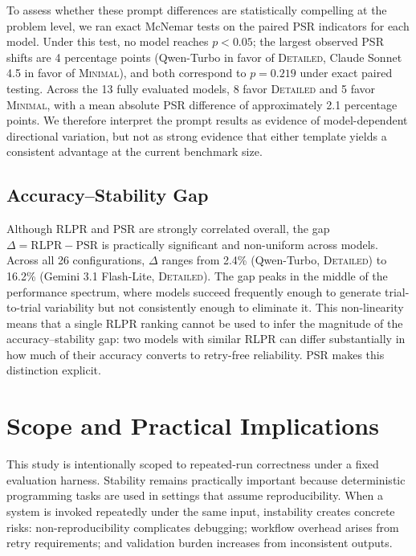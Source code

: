 \documentclass[11pt]{article}
\begin{document}
To assess whether these prompt differences are statistically compelling at the problem level, we ran exact McNemar tests on the paired PSR indicators for each model. Under this test, no model reaches $p<0.05$; the largest observed PSR shifts are 4 percentage points (Qwen-Turbo in favor of \textsc{Detailed}, Claude Sonnet 4.5 in favor of \textsc{Minimal}), and both correspond to $p=0.219$ under exact paired testing. Across the 13 fully evaluated models, 8 favor \textsc{Detailed} and 5 favor \textsc{Minimal}, with a mean absolute PSR difference of approximately 2.1 percentage points. We therefore interpret the prompt results as evidence of model-dependent directional variation, but not as strong evidence that either template yields a consistent advantage at the current benchmark size.

\subsection{Accuracy--Stability Gap}

Although RLPR and PSR are strongly correlated overall, the gap $\Delta = \mathrm{RLPR} - \mathrm{PSR}$ is practically significant and non-uniform across models. Across all 26 configurations, $\Delta$ ranges from 2.4\% (Qwen-Turbo, \textsc{Detailed}) to 16.2\% (Gemini 3.1 Flash-Lite, \textsc{Detailed}). The gap peaks in the middle of the performance spectrum, where models succeed frequently enough to generate trial-to-trial variability but not consistently enough to eliminate it. This non-linearity means that a single RLPR ranking cannot be used to infer the magnitude of the accuracy--stability gap: two models with similar RLPR can differ substantially in how much of their accuracy converts to retry-free reliability. PSR makes this distinction explicit.

\section{Scope and Practical Implications}

This study is intentionally scoped to repeated-run correctness under a fixed evaluation harness. Stability remains practically important because deterministic programming tasks are used in settings that assume reproducibility. When a system is invoked repeatedly under the same input, instability creates concrete risks: non-reproducibility complicates debugging; workflow overhead arises from retry requirements; and validation burden increases from inconsistent outputs.
\end{document}
